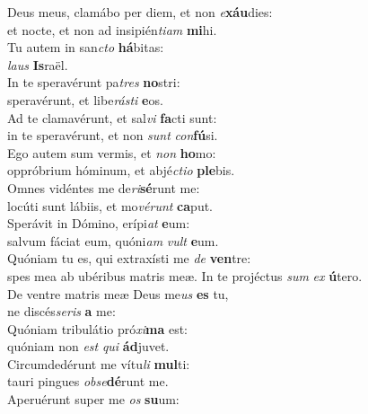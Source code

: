 \evenverse Deus meus, clamábo per diem, et non \textit{e}\textbf{xáu}dies:~\*\\
\evenverse et nocte, et non ad insipién\textit{ti}\textit{am} \textbf{mi}hi.\\
\oddverse Tu autem in san\textit{cto} \textbf{há}bitas:~\*\\
\oddverse \textit{laus} \textbf{Is}raël.\\
\evenverse In te speravérunt pa\textit{tres} \textbf{no}stri:~\*\\
\evenverse speravérunt, et libe\textit{rá}\textit{sti} \textbf{e}os.\\
\oddverse Ad te clamavérunt, et sal\textit{vi} \textbf{fa}cti sunt:~\*\\
\oddverse in te speravérunt, et non \textit{sunt} \textit{con}\textbf{fú}si.\\
\evenverse Ego autem sum vermis, et \textit{non} \textbf{ho}mo:~\*\\
\evenverse oppróbrium hóminum, et abjé\textit{cti}\textit{o} \textbf{ple}bis.\\
\oddverse Omnes vidéntes me de\textit{ri}\textbf{sé}runt me:~\*\\
\oddverse locúti sunt lábiis, et mo\textit{vé}\textit{runt} \textbf{ca}put.\\
\evenverse Sperávit in Dómino, erípi\textit{at} \textbf{e}um:~\*\\
\evenverse salvum fáciat eum, quóni\textit{am} \textit{vult} \textbf{e}um.\\
\oddverse Quóniam tu es, qui extraxísti me \textit{de} \textbf{ven}tre:~\*\\
\oddverse spes mea ab ubéribus matris meæ. In te projéctus \textit{sum} \textit{ex} \textbf{ú}tero.\\
\evenverse De ventre matris meæ Deus me\textit{us} \textbf{es} tu,~\*\\
\evenverse ne discés\textit{se}\textit{ris} \textbf{a} me:\\
\oddverse Quóniam tribulátio pró\textit{xi}\textbf{ma} est:~\*\\
\oddverse quóniam non \textit{est} \textit{qui} \textbf{ád}juvet.\\
\evenverse Circumdedérunt me vítu\textit{li} \textbf{mul}ti:~\*\\
\evenverse tauri pingues \textit{ob}\textit{se}\textbf{dé}runt me.\\
\oddverse Aperuérunt super me \textit{os} \textbf{su}um:~\*\\

